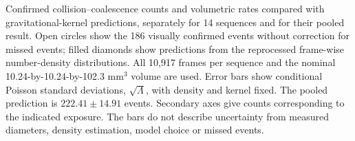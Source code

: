 Confirmed collision--coalescence counts and volumetric rates compared with gravitational-kernel predictions, separately for 14 sequences and for their pooled result. Open circles show the 186 visually confirmed events without correction for missed events; filled diamonds show predictions from the reprocessed frame-wise number-density distributions. All 10,917 frames per sequence and the nominal 10.24-by-10.24-by-102.3 \(\mathrm{mm^3}\) volume are used. Error bars show conditional Poisson standard deviations, \(\sqrt{\Lambda}\), with density and kernel fixed. The pooled prediction is \(222.41\pm14.91\) events. Secondary axes give counts corresponding to the indicated exposure. The bars do not describe uncertainty from measured diameters, density estimation, model choice or missed events.
